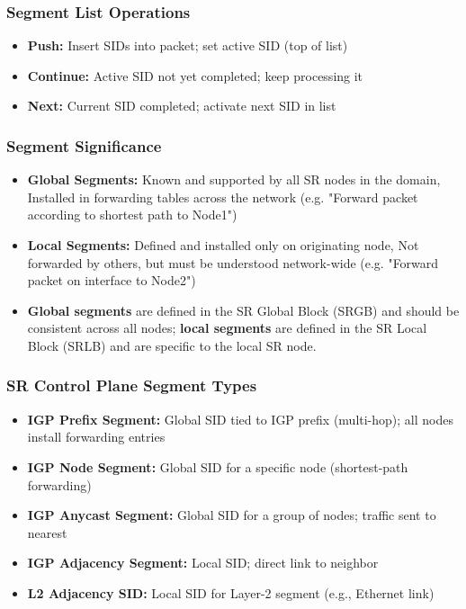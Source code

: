 \begin{multicols*}{5}
		\subsubsection{Segment List Operations}
		\begin{itemize}
			\item \textbf{Push:} Insert SIDs into packet; set active SID (top of list)
			\item \textbf{Continue:} Active SID not yet completed; keep processing it
			\item \textbf{Next:} Current SID completed; activate next SID in list
		\end{itemize}
		\subsubsection{Segment Significance}
		\begin{itemize}
			\item \textbf{Global Segments:} Known and supported by all SR nodes in the domain, Installed in forwarding tables across the network (e.g. "Forward packet according to shortest path to Node1")
			\item \textbf{Local Segments:} Defined and installed only on originating node, Not forwarded by others, but must be understood network-wide (e.g. "Forward packet on interface to Node2")
			\item \textbf{Global segments} are defined in the SR Global Block (SRGB) and should be consistent across all nodes; \textbf{local segments} are defined in the SR Local Block (SRLB) and are specific to the local SR node.
		\end{itemize}
		\subsubsection{SR Control Plane Segment Types}
		\begin{itemize}
			\item \textbf{IGP Prefix Segment:} Global SID tied to IGP prefix (multi-hop); all nodes install forwarding entries
			\item \textbf{IGP Node Segment:} Global SID for a specific node (shortest-path forwarding)
			\item \textbf{IGP Anycast Segment:} Global SID for a group of nodes; traffic sent to nearest
			\item \textbf{IGP Adjacency Segment:} Local SID; direct link to neighbor
			\item \textbf{L2 Adjacency SID:} Local SID for Layer-2 segment (e.g., Ethernet link)
		\end{itemize}
		

\end{multicols*}
